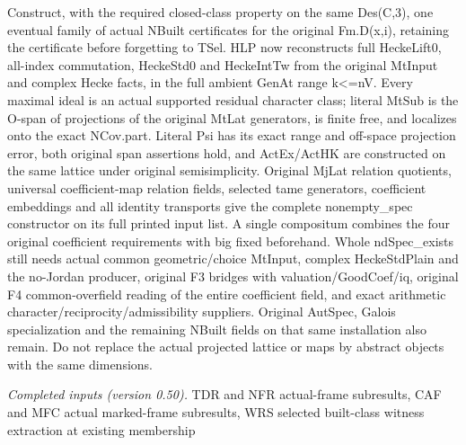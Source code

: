 \documentclass[11pt,a4paper]{article}
\numberwithin{equation}{section}
\theoremstyle{remark}\newtheorem{remark}[theorem]{Remark}
\begin{document}
Construct, with the required closed-class property on the same Des(C,3), one eventual family of actual NBuilt certificates for the original Fm.D(x,i), retaining the certificate before forgetting to TSel. HLP now reconstructs full HeckeLift0, all-index commutation, HeckeStd0 and HeckeIntTw from the original MtInput and complex Hecke facts, in the full ambient GenAt range k<=nV. Every maximal ideal is an actual supported residual character class; literal MtSub is the O-span of projections of the original MtLat generators, is finite free, and localizes onto the exact NCov.part. Literal Psi has its exact range and off-space projection error, both original span assertions hold, and ActEx/ActHK are constructed on the same lattice under original semisimplicity. Original MjLat relation quotients, universal coefficient-map relation fields, selected tame generators, coefficient embeddings and all identity transports give the complete nonempty\_\allowbreak spec constructor on its full printed input list. A single compositum combines the four original coefficient requirements with big fixed beforehand. Whole ndSpec\_\allowbreak exists still needs actual common geometric/choice MtInput, complex HeckeStdPlain and the no-Jordan producer, original F3 bridges with valuation/GoodCoef/iq, original F4 common-overfield reading of the entire coefficient field, and exact arithmetic character/reciprocity/admissibility suppliers. Original AutSpec, Galois specialization and the remaining NBuilt fields on that same installation also remain. Do not replace the actual projected lattice or maps by abstract objects with the same dimensions.

\emph{Completed inputs (version 0.50).} TDR and NFR actual-frame subresults, CAF and MFC actual marked-frame subresults, WRS selected built-class witness extraction at existing membership
\end{document}
